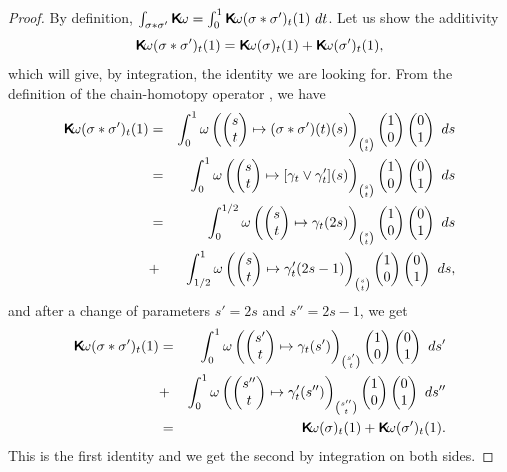 \documentclass[10pt,reqno,letterpaper,twoside]{amsbook}
\begin{document}
  \begin{proof}
    By definition,
    $\int_{\sigma * \sigma'} \boldsymbol{\mathsf{K}}\!\omega = \int_0^1 \boldsymbol{\mathsf{K}}\!\omega(\sigma * \sigma')_t(1) \ dt$.
    Let us show the additivity
    $$
      \boldsymbol{\mathsf{K}}\!\omega(\sigma * \sigma')_t(1) = \boldsymbol{\mathsf{K}}\!\omega(\sigma)_t(1) + \boldsymbol{\mathsf{K}}\!\omega(\sigma')_t(1),
      $$
    which will give,
    by integration,
    the identity we are looking for.
    From the definition of the chain-homotopy operator \cite[]{PIZ13},
    we have
    \begin{eqnarray*}
      \Komega(\sigma * \sigma')_t(1)
      & =& \int_0^1 \omega \left(\Vector{s \\ t} \mapsto (\sigma * \sigma')(t) (s) \right)_{{s \choose t}}\Vector{1 \\ 0} \Vector{0 \\ 1} \ ds \\
      & =& \int_0^1 \omega \left(\Vector{s \\ t} \mapsto [\gamma_t \vee \gamma'_t] (s) \right)_{{s \choose t}}\Vector{1 \\ 0} \Vector{0 \\ 1} \ ds \\
      & =& \int_0^{1/2} \omega \left(\Vector{s \\ t} \mapsto \gamma_t(2s) \right)_{{s \choose t}}\Vector{1 \\ 0} \Vector{0 \\ 1} \ ds \\
      & + & \int_{1/2}^1 \omega \left(\Vector{s \\ t} \mapsto \gamma'_t(2s-1) \right)_{{s \choose t}}\Vector{1 \\ 0} \Vector{0 \\ 1} \ ds,
    \end{eqnarray*}
    and after a change of parameters $s' = 2s$ and $s'' = 2s-1$, we get
    \begin{eqnarray*}
      \Komega(\sigma * \sigma')_t(1)
      & =& \int_0^1 \omega \left(\Vector{s' \\ t} \mapsto \gamma_t(s') \right)_{{s' \choose t}}\Vector{1 \\ 0} \Vector{0 \\ 1} \ ds' \\
      & + & \int_0^1 \omega \left(\Vector{s'' \\ t} \mapsto \gamma'_t(s'') \right)_{{s'' \choose t}}\Vector{1 \\ 0} \Vector{0 \\ 1} \ ds'' \\
      & = & \Komega(\sigma)_t(1) + \Komega(\sigma')_t(1).
    \end{eqnarray*}
    This is the first identity and we get the second by integration on both sides.
  \end{proof}
  
\end{document}
